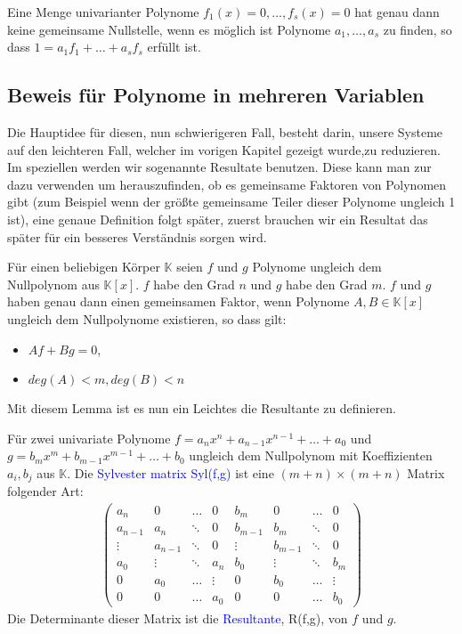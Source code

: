 \begin{corollary}
Eine Menge univarianter Polynome $f_1(x)=0,\ldots,f_s(x)=0$ hat genau dann keine gemeinsame Nullstelle, wenn es möglich ist Polynome $a_1,\ldots, a_s$ zu finden, so dass $1 = a_1f_1+ \ldots + a_sf_s$ erfüllt ist.
\end{corollary}

\subsection{Beweis für Polynome in mehreren Variablen}

Die Hauptidee für diesen, nun schwierigeren Fall, besteht darin, unsere Systeme auf den leichteren Fall, welcher im vorigen Kapitel gezeigt wurde,zu reduzieren. Im speziellen werden wir sogenannte Resultate benutzen. Diese kann man zur dazu verwenden um herauszufinden, ob es gemeinsame Faktoren von Polynomen gibt (zum Beispiel wenn der größte gemeinsame Teiler dieser Polynome ungleich 1 ist), eine genaue Definition folgt später, zuerst brauchen wir ein Resultat das später für ein besseres Verständnis sorgen wird.

\begin{lemma}
Für einen beliebigen Körper $\mathbb{K}$ seien $f$ und $g$ Polynome ungleich dem Nullpolynom aus $\mathbb{K}[x]$. $f$ habe den Grad $n$ und $g$ habe den Grad $m$. $f$ und $g$ haben genau dann einen gemeinsamen Faktor, wenn Polynome $A,B \in \mathbb{K}[x]$ ungleich dem Nullpolynome existieren, so dass gilt:
\begin{itemize}
\item $Af + Bg = 0$,
\item $deg(A) < m, deg(B) < n$
\end{itemize}
\end{lemma}

\noindent Mit diesem Lemma ist es nun ein Leichtes die Resultante zu definieren.

\begin{definition}
Für zwei univariate Polynome $f = a_nx^n+a_{n-1}x^{n-1}+\ldots + a_0$ und $g = b_mx^m+b_{m-1}x^{m-1}+\ldots+b_0$ ungleich dem Nullpolynom mit Koeffizienten $a_i, b_j$ aus $\mathbb{K}$. Die \textcolor{blue}{Sylvester matrix Syl(f,g)} ist eine $(m+n) \times (m+n)$ Matrix folgender Art:
\begin{align*}
\begin{pmatrix}
a_n & 0 &\dots & 0 & b_m & 0 & \ldots & 0 \\
a_{n-1} & a_n & \ddots & 0 & b_{m-1} & b_m & \ddots & 0 \\
\vdots & a_{n-1} & \ddots & 0 & \vdots & b_{m-1} & \ddots & 0 \\
a_0 & \vdots & \ddots & a_n & b_0 & \vdots & \ddots & b_m\\
0 & a_0 & \dots & \vdots & 0 & b_0 & \dots & \vdots \\
0 & 0 & \dots & a_0 & 0 & 0 & \dots & b_0
\end{pmatrix}
\end{align*}
Die Determinante dieser Matrix ist die \textcolor{blue}{Resultante}, R(f,g), von $f$ und $g$. 
\end{definition}

